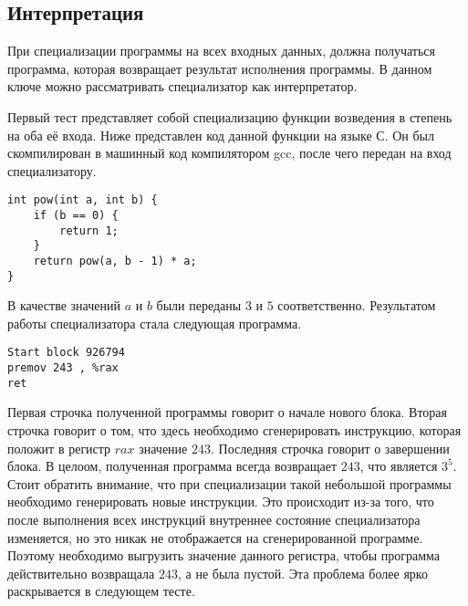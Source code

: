 \documentclass{spbau-diploma}
\begin{document}
\subsection{ Интерпретация}
При специализации программы на всех входных данных, должна получаться программа, которая возвращает результат исполнения программы. В данном ключе можно рассматривать специализатор как интерпретатор.

Первый тест представляет собой специализацию функции возведения в степень на оба её входа. Ниже представлен код данной функции на языке С. Он был скомпилирован в машинный код компилятором gcc, после чего передан на вход специализатору.
\begin{lstlisting}
int pow(int a, int b) {
    if (b == 0) {
        return 1;
    }
    return pow(a, b - 1) * a;
}
\end{lstlisting}
В качестве значений $a$ и $b$ были переданы $3$ и $5$ соответственно. Результатом работы специализатора стала следующая программа.
\begin{lstlisting}
Start block 926794
premov 243 , %rax 
ret
\end{lstlisting}
Первая строчка полученной программы говорит о начале нового блока. Вторая строчка говорит о том, что здесь необходимо сгенерировать инструкцию, которая положит в регистр $rax$ значение $243$. Последняя строчка говорит о завершении блока. В целоом, полученная программа всегда возвращает $243$, что является $3^5$. Стоит обратить внимание, что при специализации такой небольшой программы необходимо генерировать новые инструкции. Это происходит из-за того, что после выполнения всех инструкций внутреннее состояние специализатора изменяется, но это никак не отображается на сгенерированной программе. Поэтому необходимо выгрузить значение данного регистра, чтобы программа действительно возвращала $243$, а не была пустой. Эта проблема более ярко раскрывается в следующем тесте.
\end{document}
